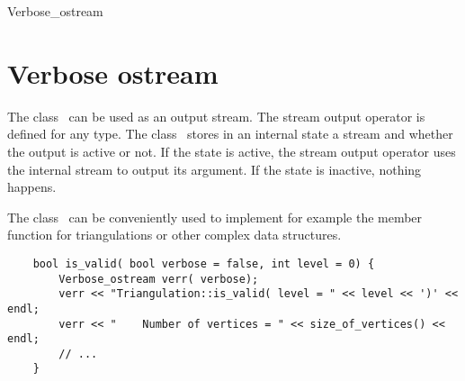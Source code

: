 \begin{ccClass}{Verbose_ostream}
\section{Verbose ostream}

\ccDefinition

The class \ccClassTemplateName\ can be used as an output stream. The
stream output operator \ccc{<<} is defined for any type. The
class \ccClassTemplateName\ stores in an internal state a stream and
whether the output is active or not. If the state is active, the
stream output operator \ccc{<<} uses the internal stream to output
its argument. If the state is inactive, nothing happens.


\ccCreation
{}


\ccOperations


\ccExample

The class \ccClassTemplateName\ can be conveniently used to implement
for example the  member function for triangulations or
other complex data structures.

\begin{verbatim}
    bool is_valid( bool verbose = false, int level = 0) {
        Verbose_ostream verr( verbose);
        verr << "Triangulation::is_valid( level = " << level << ')' << endl;
        verr << "    Number of vertices = " << size_of_vertices() << endl;
        // ...
    }
\end{verbatim}

\end{ccClass}

\ccParDims
\beforecprogskip\parskip
{}

